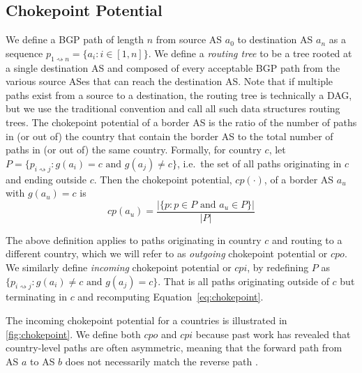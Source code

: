 \subsection{Chokepoint Potential}

We define a BGP path of length $n$ from source AS $a_0$ to destination AS $a_n$
as a sequence $p_{1\rightsquigarrow n} = \{a_i : i \in [1,n]\}$.  We define a
\textit{routing tree} to be a tree rooted at a single destination AS and
composed of every acceptable BGP path from the various source ASes that can
reach the destination AS. Note that if multiple paths exist from a source
to a destination, the routing tree is technically a DAG, but we use the traditional convention and call
all such data structures routing trees. The
chokepoint potential of a border AS is the ratio of the number of paths in (or out of) the country that contain the border AS to
the total number of paths in (or out of) the same country.
Formally, for country $c$, let $P = \{p_{i \rightsquigarrow
j} : g(a_i)=c \text{ and } g(a_j)\neq c\} $, i.e.\ the set of all paths
originating in $c$ and ending outside $c$. Then the chokepoint potential,
$cp(\cdot)$, of a border AS $a_u$ with $g(a_u) = c$ is
\begin{equation}
  \label{eq:chokepoint}
  cp(a_u) = \frac{|\{p: p \in P \text{ and } a_u \in P\}|}{|P|}
\end{equation}


The above definition applies to paths originating in country
$c$ and routing to a different country, which we will refer to as
\textit{outgoing} chokepoint potential or $cpo$. We similarly define
\textit{incoming} chokepoint potential or $cpi$, by redefining $P$ as $\{p_{i
\rightsquigarrow j}: g(a_i) \neq c \text{ and } g(a_j) = c\}$. That is all
paths originating outside of $c$ but terminating in $c$ and recomputing
Equation~\ref{eq:chokepoint}. 

The incoming chokepoint
potential for a countries is illustrated in \figurename
\ref{fig:chokepoint}. We define both $cpo$ and $cpi$ because past work
has revealed that country-level paths are often asymmetric, meaning that the
forward path from AS $a$ to AS $b$ does not necessarily match the reverse path
\cite{characterizingAndAvoiding}.

